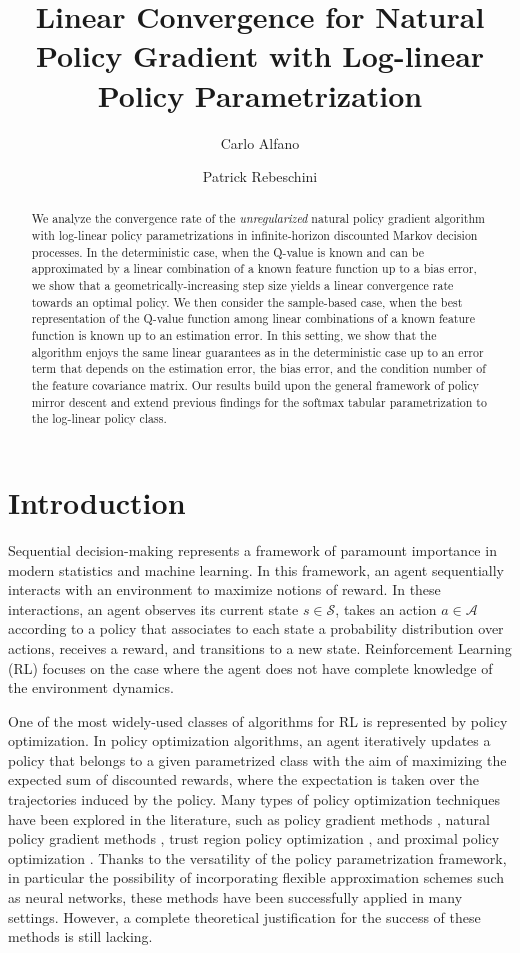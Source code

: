 \documentclass[a4paper,12pt]{article}
\title{Linear Convergence for Natural Policy Gradient with Log-linear Policy Parametrization}
\author[*]{Carlo Alfano}
\author[*]{Patrick Rebeschini}
\affil[*]{Department of Statistics, University of Oxford}
\date{\vspace{-5ex}}
\numberwithin{theorem}{section}
\newcommand\A{\mathcal{A}}
\renewcommand\S{\mathcal{S}}
\newcommand\1{\mathbf{1}}
\begin{document}
\maketitle

\begin{abstract}
	We analyze the convergence rate of the \emph{unregularized} natural policy gradient algorithm with log-linear policy parametrizations in infinite-horizon discounted Markov decision processes. In the deterministic case, when the Q-value is known and can be approximated by a linear combination of a known feature function up to a bias error, we show that a geometrically-increasing step size yields a linear convergence rate towards an optimal policy.
	We then consider the sample-based case, when the best representation of the Q-value function among linear combinations of a known feature function is known up to an estimation error.
	In this setting, we show that the algorithm enjoys the same linear guarantees as in the deterministic case up to an error term that depends on the estimation error, the bias error, and the condition number of the feature covariance matrix. Our results build upon the general framework of policy mirror descent and extend previous findings for the softmax tabular parametrization to the log-linear policy class.
\end{abstract}
\section{Introduction}
Sequential decision-making represents a framework of paramount importance in modern statistics and machine learning. In this framework, an agent sequentially interacts with an environment to maximize notions of reward. In these interactions, an agent observes its current state $s\in\S$, takes an action $a\in\A$ according to a policy that associates to each state a probability distribution over actions, receives a reward, and transitions to a new state. Reinforcement Learning (RL) focuses on the case where the agent does not have complete knowledge of the environment dynamics.

One of the most widely-used classes of algorithms for RL is represented by policy optimization. In policy optimization algorithms, an agent iteratively updates a policy that belongs to a given parametrized class with the aim of maximizing the expected sum of discounted rewards, where the expectation is taken over the trajectories induced by the policy. Many types of policy optimization techniques have been explored in the literature, such as policy gradient methods \citep{RN158}, natural policy gradient methods \citep{RN159}, trust region policy optimization \citep{RN214}, and proximal policy optimization \citep{RN182}.
Thanks to the versatility of the policy parametrization framework, in particular the possibility of incorporating flexible approximation schemes such as neural networks, these methods have been successfully applied in many settings.
However, a complete theoretical justification for the success of these methods is still lacking.
\end{document}

